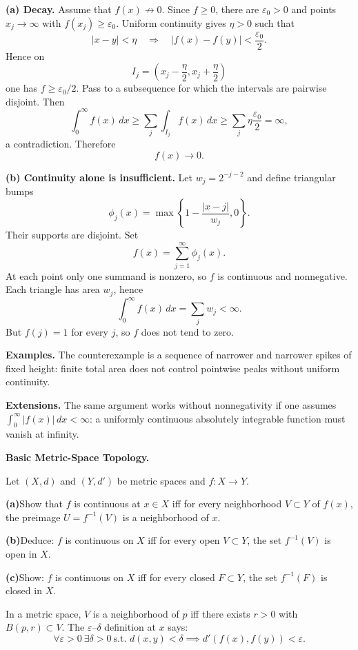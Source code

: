 \begin{solution}

\par\smallskip\noindent\textbf{(a) Decay.}
Assume that \(f(x)\not\to0\). Since \(f\ge0\), there are
\(\varepsilon_0>0\) and points \(x_j\to\infty\) with
\(f(x_j)\ge\varepsilon_0\). Uniform continuity gives \(\eta>0\) such that
\[
|x-y|<\eta
\quad\Longrightarrow\quad
|f(x)-f(y)|<\frac{\varepsilon_0}{2}.
\]
Hence on
\[
I_j=\left(x_j-\frac\eta2,x_j+\frac\eta2\right)
\]
one has \(f\ge\varepsilon_0/2\). Pass to a subsequence for which the
intervals are pairwise disjoint. Then
\[
\int_0^\infty f(x)\,dx
\ge
\sum_j\int_{I_j}f(x)\,dx
\ge
\sum_j\eta\frac{\varepsilon_0}{2}
=\infty,
\]
a contradiction. Therefore
\[
\boxed{f(x)\to0.}
\]

\par\smallskip\noindent\textbf{(b) Continuity alone is insufficient.}
Let \(w_j=2^{-j-2}\) and define triangular bumps
\[
\phi_j(x)=\max\left\{1-\frac{|x-j|}{w_j},0\right\}.
\]
Their supports are disjoint. Set
\[
f(x)=\sum_{j=1}^\infty\phi_j(x).
\]
At each point only one summand is nonzero, so \(f\) is continuous and
nonnegative. Each triangle has area \(w_j\), hence
\[
\int_0^\infty f(x)\,dx=\sum_jw_j<\infty.
\]
But \(f(j)=1\) for every \(j\), so \(f\) does not tend to zero.

\medskip
\noindent\textbf{Examples.}
The counterexample is a sequence of narrower and narrower spikes of fixed
height: finite total area does not control pointwise peaks without uniform
continuity.

\medskip
\noindent\textbf{Extensions.}
The same argument works without nonnegativity if one assumes
\(\int_0^\infty|f(x)|\,dx<\infty\): a uniformly continuous absolutely
integrable function must vanish at infinity.
\end{solution}

\begin{problem}[CP-II-0114]
\label{prob:cp-ii-0114}
\textbf{Basic Metric-Space Topology.}

\hspace*{1.5em}Let $(X,d)$ and $(Y,d')$ be metric spaces and $f:X\to Y$.

	\par\smallskip\noindent\textbf{(a)}\quad Show that $f$ is continuous at $x\in X$ iff for every neighborhood $V\subset Y$ of $f(x)$, the preimage $U=f^{-1}(V)$ is a neighborhood of $x$.
	\par\smallskip\noindent\textbf{(b)}\quad Deduce: $f$ is continuous on $X$ iff for every open $V\subset Y$, the set $f^{-1}(V)$ is open in $X$.
	\par\smallskip\noindent\textbf{(c)}\quad Show: $f$ is continuous on $X$ iff for every closed $F\subset Y$, the set $f^{-1}(F)$ is closed in $X$.

In a metric space, $V$ is a neighborhood of $p$ iff there exists $r>0$ with $B(p,r)\subset V$.
The $\varepsilon$--$\delta$ definition at $x$ says:
\[
\forall\varepsilon>0\ \exists\delta>0\ \text{s.t. } d(x,y)<\delta \implies d'(f(x),f(y))<\varepsilon.
\]
\end{problem}

